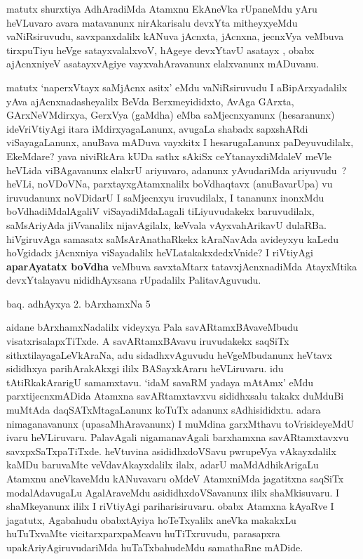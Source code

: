 \begin{artha}
matutx shurxtiya AdhAradiMda Atamxnu EkAneVka rUpaneMdu yAru heVLuvaro avara 
matavanunx nirAkarisalu devxYta mitheyxyeMdu vaNiRsiruvudu, savxpanxdalilx 
kANuva jAcnxta, jAcnxna, jecnxVya veMbuva tirxpuTiyu heVge satayxvalalxvoV, 
hAgeye devxYtavU asatayx , obabx ajAcnxniyeV asatayxvAgiye  vayxvahAravanunx 
elalxvanunx mADuvanu. 

matutx `naperxVtayx saMjAcnx asitx' eMdu vaNiRsiruvudu I aBipArxyadalilx \mdash  yAva ajAcnxnadasheyalilx 
BeVda Berxmeyididxto, AvAga GArxta, GArxNeVMdirxya, GerxVya (gaMdha) eMba 
saMjecnxyanunx (hesaranunx) ideVriVtiyAgi itara iMdirxyagaLanunx, avugaLa 
shabadx sapxshARdi viSayagaLanunx, anuBava mADuva vayxkitx I hesarugaLanunx paDeyuvudilalx,
EkeMdare? yava niviRkAra kUDa sathx sAkiSx ceYtanayxdiMdaleV meVle heVLida viBAgavanunx 
elalxrU ariyuvaro, adanunx yAvudariMda ariyuvudu~? heVLi, noVDoVNa, parxtayxgAtamxnalilx 
boVdhaqtavx (anuBavarUpa) vu iruvudanunx  noVDidarU I saMjecnxyu iruvudilalx, I tananunx 
inonxMdu boVdhadiMdalAgaliV viSayadiMdaLagali tiLiyuvudakekx baruvudilalx, saMsAriyAda 
jiVvanalilx nijavAgilalx, keVvala vAyxvahArikavU dulaRBa. hiVgiruvAga samasatx 
saMsArAnathaRkekx kAraNavAda avideyxyu kaLedu hoVgidadx jAcnxniya viSayadalilx 
heVLatakakxdedxVnide? I riVtiyAgi \textbf{aparAyatatx boVdha} veMbuva savxtaMtarx 
tatavxjAcnxnadiMda AtayxMtika devxYtalayavu nididhAyxsana rUpadalilx PalitavAguvudu.
\end{artha}
\newpage

\centerline{baq. adhAyxya 2. bArxhamxNa 5}
\centerline{}

\begin{artha}
aidane bArxhamxNadalilx videyxya Pala savARtamxBAvaveMbudu visatxrisalapxTiTxde. A savARtamxBAvavu iruvudakekx saqSiTx sithxtilayagaLeVkAraNa, adu sidadhxvAguvudu heVgeMbudanunx heVtavx sididhxya parihArakAkxgi ililx BASayxkAraru heVLiruvaru. idu tAtiRkakArarigU samamxtavu. `idaM savaRM yadaya mAtAmx' eMdu parxtijecnxmADida Atamxna savARtamxtavxvu sididhxsalu takakx duMduBi muMtAda daqSATxMtagaLanunx koTuTx adanunx sAdhisididxtu. adara nimaganavanunx (upasaMhAravanunx) I muMdina garxMthavu toVrisideyeMdU ivaru heVLiruvaru. PalavAgali nigamanavAgali barxhamxna savARtamxtavxvu savxpxSaTxpaTiTxde. heVtuvina asididhxdoVSavu pwrupeVya vAkayxdalilx kaMDu baruvaMte veVdavAkayxdalilx ilalx, adarU maMdAdhikArigaLu Atamxnu aneVkaveMdu kANuvavaru oMdeV AtamxniMda jagatitxna saqSiTx modalAdavugaLu AgalAraveMdu asididhxdoVSavanunx ililx shaMkisuvaru. I shaMkeyanunx ililx I riVtiyAgi pariharisiruvaru. obabx Atamxna kAyaRve I jagatutx, Agabahudu obabxtAyiya hoTeTxyalilx aneVka makakxLu huTuTxvaMte vicitarxparxpaMcavu huTiTxruvudu, parasapxra upakAriyAgiruvudariMda huTaTxbahudeMdu samathaRne mADide.
\end{artha}

